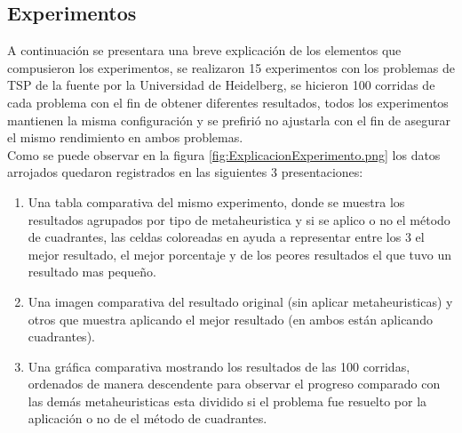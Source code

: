 \clearpage \newpage
\subsection{Experimentos}

A continuación se presentara una breve explicación de los elementos que compusieron los experimentos, se realizaron 15 experimentos con los problemas de TSP de la fuente\cite{[TSPLIB]} por la Universidad de Heidelberg, se hicieron 100 corridas de cada problema con el fin de obtener diferentes resultados, todos los experimentos mantienen la misma configuración y se prefirió no ajustarla con el fin de asegurar el mismo rendimiento en ambos problemas.\\
Como se puede observar en la figura \ref {fig:ExplicacionExperimento.png} los datos arrojados quedaron registrados en las siguientes 3 presentaciones:

\begin{enumerate}[label=\Alph*.-]
\item Una tabla comparativa del mismo experimento, donde se muestra los resultados agrupados por tipo de metaheuristica y si se aplico o no el método de cuadrantes, las celdas coloreadas en ayuda a representar entre los 3 el mejor resultado, el mejor porcentaje y de los peores resultados el que tuvo un resultado mas pequeño.
\item Una imagen comparativa del resultado original (sin aplicar metaheuristicas) y otros que muestra aplicando el mejor resultado (en ambos están aplicando cuadrantes).
\item Una gráfica comparativa mostrando los resultados de las 100 corridas, ordenados de manera descendente para observar el progreso comparado con las demás metaheuristicas esta dividido si el problema fue resuelto por la aplicación o no de el método de cuadrantes.
\end{enumerate}

\clearpage \newpage

